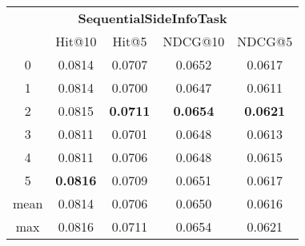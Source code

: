 \documentclass{article}
\begin{document}
 

\begin{tabular}{c|cccc}

\multicolumn{5}{c}{\textbf{SequentialSideInfoTask}} \\
\noalign{\smallskip}
\noalign{\smallskip}
\toprule
\multicolumn{1}{c}{Template ID} & \multicolumn{1}{|c}{Hit@10} & \multicolumn{1}{c}{Hit@5} & \multicolumn{1}{c}{NDCG@10} & \multicolumn{1}{c}{NDCG@5} \\
\midrule
0 & 0.0814 & 0.0707 & 0.0652 & 0.0617 \\
1 & 0.0814 & 0.0700 & 0.0647 & 0.0611 \\
2 & 0.0815 & \textbf{0.0711} & \textbf{0.0654} & \textbf{0.0621} \\
3 & 0.0811 & 0.0701 & 0.0648 & 0.0613 \\
4 & 0.0811 & 0.0706 & 0.0648 & 0.0615 \\
5 & \textbf{0.0816} & 0.0709 & 0.0651 & 0.0617 \\
\midrule
mean & 0.0814 & 0.0706 & 0.0650 & 0.0616 \\
max & 0.0816 & 0.0711 & 0.0654 & 0.0621 \\
\bottomrule

\end{tabular}
\end{document}
